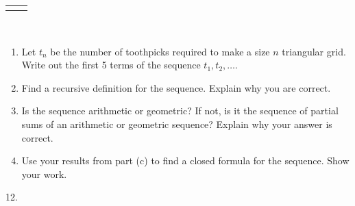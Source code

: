 \documentclass[12pt,]{book}
\theoremstyle{plain}
\theoremstyle{definition}
\theoremstyle{definition}
\theoremstyle{definition}
\numberwithin{equation}{chapter}
\newlength{\panelmax}
\begin{document}
\begin{exerciselist}
{\begin{lrbox}{\panelboxBimage}
{{
}
}\end{lrbox}
\ifdefined\phBimage\else\newlength{\phBimage}\fi%
\setlength{\phBimage}{\ht\panelboxBimage+\dp\panelboxBimage}
\settototalheight{\phBimage}{\usebox{\panelboxBimage}}
\setlength{\panelmax}{\maxof{\panelmax}{\phBimage}}
\leavevmode%
\setlength{\tabcolsep}{0.14\linewidth}
\par\medskip\noindent
\hspace*{0.14\linewidth}%
\begin{tabular}{@{}*{2}{c}@{}}
\begin{minipage}[c][\panelmax][b]{0.16\linewidth}\usebox{\panelboxAimage}\end{minipage}&
\begin{minipage}[c][\panelmax][b]{0.28\linewidth}\usebox{\panelboxBimage}\end{minipage}\end{tabular}\\
}%
\par
\hypertarget{p-214}{}%
\leavevmode%
\begin{enumerate}[label=(\alph*)]
\item\hypertarget{li-125}{}\hypertarget{p-215}{}%
Let \(t_n\) be the number of toothpicks required to make a size \(n\) triangular grid. Write out the first 5 terms of the sequence \(t_1, t_2, \ldots\). %
\item\hypertarget{li-126}{}\hypertarget{p-216}{}%
Find a recursive definition for the sequence. Explain why you are correct. %
\item\hypertarget{li-127}{}\hypertarget{p-217}{}%
Is the sequence arithmetic or geometric? If not, is it the sequence of partial sums of an arithmetic or geometric sequence? Explain why your answer is correct. %
\item\hypertarget{li-128}{}\hypertarget{p-218}{}%
Use your results from part (c) to find a closed formula for the sequence. Show your work. %
\end{enumerate}
%
\par\smallskip
\item[12.]\hypertarget{exercise-21}{}\hypertarget{p-219}{}%

\end{exerciselist}
\end{document}
